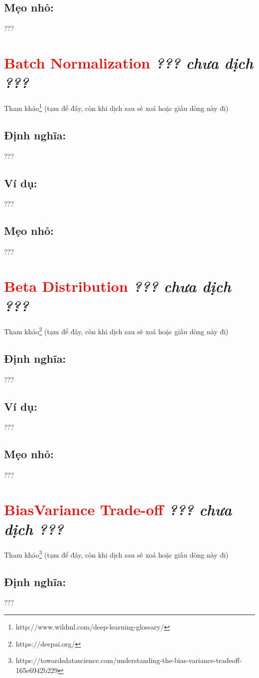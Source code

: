 \subsection*{Mẹo nhỏ:}
???
\section*{\huge \textcolor{Red}{Batch Normalization}  \small \textit{??? chưa dịch ???} }
Tham khảo\footnote{http://www.wildml.com/deep-learning-glossary/} (tạm để đây, còn khi dịch sau sẽ xoá hoặc giấu dòng này đi)
\subsection*{Định nghĩa:}
???
\subsection*{Ví dụ:}
???
\subsection*{Mẹo nhỏ:}
???
\section*{\huge \textcolor{Red}{Beta Distribution}  \small \textit{??? chưa dịch ???} }
Tham khảo\footnote{https://deepai.org/} (tạm để đây, còn khi dịch sau sẽ xoá hoặc giấu dòng này đi)
\subsection*{Định nghĩa:}
???
\subsection*{Ví dụ:}
???
\subsection*{Mẹo nhỏ:}
???
\section*{\huge \textcolor{Red}{BiasVariance Trade-off}  \small \textit{??? chưa dịch ???} }
Tham khảo\footnote{https://towardsdatascience.com/understanding-the-bias-variance-tradeoff-165e6942b229} (tạm để đây, còn khi dịch sau sẽ xoá hoặc giấu dòng này đi)
\subsection*{Định nghĩa:}
???
